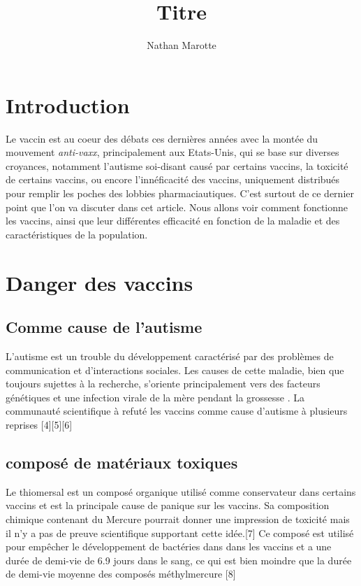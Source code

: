 \documentclass[10pt]{article}
\title{Titre}
\author{Nathan Marotte}
\begin{document}
\maketitle
\section{Introduction}
Le vaccin est au coeur des débats ces dernières années avec la montée du mouvement \textit{anti-vaxx}, principalement aux Etats-Unis, qui se base sur diverses croyances, notamment l'autisme soi-disant causé par certains vaccins, la toxicité de certains vaccins, ou encore l'innéficacité des vaccins, uniquement distribués pour remplir les poches des lobbies pharmaciautiques. C'est surtout de ce dernier point que l'on va discuter dans cet article. Nous allons voir comment fonctionne les vaccins, ainsi que leur différentes efficacité en fonction de la maladie et des caractéristiques de la population.

\section{Danger des vaccins}


\subsection{Comme cause de l'autisme}
L'autisme est un trouble du développement caractérisé par des problèmes de communication et d'interactions sociales. Les causes de cette maladie, bien que toujours sujettes à la recherche, s'oriente principalement vers des facteurs génétiques \cite{genetics} et une infection virale de la mère pendant la grossesse \cite{autism_viral}\cite{genetic_evaluation}. La communauté scientifique à refuté les vaccins comme cause d'autisme à plusieurs reprises [4][5][6]

\subsection{composé de matériaux toxiques}
Le thiomersal est un composé organique utilisé comme conservateur dans certains vaccins et est la principale cause de panique sur les vaccins. Sa composition chimique contenant du Mercure pourrait donner une impression de toxicité mais il n'y a pas de preuve scientifique supportant cette idée.[7] Ce composé est utilisé pour empêcher le développement de bactéries dans dans les vaccins et a une durée de demi-vie de 6.9 jours dans le sang, ce qui est bien moindre que la durée de demi-vie moyenne des composés méthylmercure [8]
\end{document}
